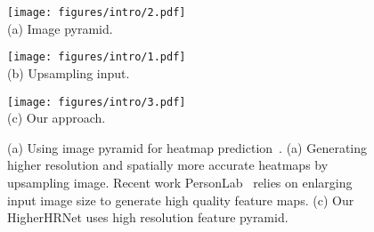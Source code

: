 \documentclass[10pt,twocolumn,letterpaper]{article}
\begin{document}
\begin{figure}
    \centering
    \begin{minipage}[b]{0.99\linewidth}
    \centering
    \vspace{2mm}
    \texttt{[image: figures/intro/2.pdf]}
    \vspace{2mm}\\
    {\footnotesize(a) Image pyramid.}
    \vspace{2mm}\\
    \end{minipage}
    \begin{minipage}[b]{0.99\linewidth}
    \centering
    \texttt{[image: figures/intro/1.pdf]}
    \vspace{2mm}\\
    {\footnotesize(b) Upsampling input.}
    \end{minipage}
    \begin{minipage}[b]{0.99\linewidth}
    \centering
    \vspace{2mm}
    \texttt{[image: figures/intro/3.pdf]}
    \vspace{2mm}\\
    {\footnotesize(c) Our approach.}
    \end{minipage}
    \vspace{2mm}
    \caption{(a) Using image pyramid for heatmap prediction~\cite{papandreou2018personlab,newwell2017associative}. (a) Generating higher resolution and  spatially more accurate heatmaps by upsampling image. Recent work PersonLab~\cite{papandreou2018personlab} relies on enlarging input image size to generate high quality feature maps.  (c) Our HigherHRNet uses high resolution feature pyramid.
    }
    \vspace{-4mm}
    \label{fig:intro}
\end{figure}
\end{document}
